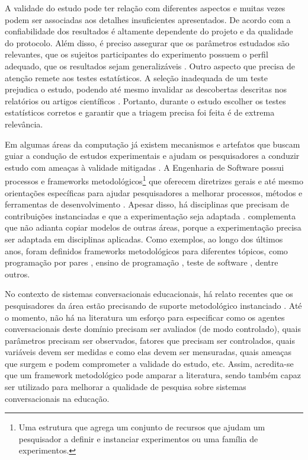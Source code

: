 A validade do estudo pode ter relação com diferentes aspectos e muitas vezes podem ser associadas aos detalhes insuficientes apresentados. De acordo com  a confiabilidade dos resultados é altamente dependente do projeto e da qualidade do protocolo. Além disso, é preciso assegurar que os parâmetros estudados são relevantes, que os sujeitos participantes do experimento possuem o perfil adequado, que os resultados sejam generalizáveis \cite{Wright}. Outro aspecto que precisa de atenção remete aos testes estatísticos. A seleção inadequada de um teste prejudica o estudo, podendo até mesmo invalidar as descobertas descritas nos relatórios ou artigos científicos \cite{Kitchenham:2002}. Portanto, durante o estudo escolher os testes estatísticos corretos e garantir que a triagem precisa foi feita é de extrema relevância. 

Em algumas áreas da computação já existem mecanismos e artefatos que buscam guiar a condução de estudos experimentais e ajudam os pesquisadores a conduzir estudo com ameaças à validade mitigadas \cite{Wohlin}. A Engenharia de Software possui processos e frameworks metodológicos\footnote{Uma estrutura que agrega um conjunto de recursos que ajudam um pesquisador a definir e instanciar experimentos ou uma família de experimentos.} que oferecem diretrizes gerais e até mesmo orientações específicas para ajudar pesquisadores a melhorar processos, métodos e ferramentas de desenvolvimento \cite{1514443}. Apesar disso, há disciplinas que precisam de contribuições instanciadas e que a experimentação seja adaptada \cite{vegas2016can}.  complementa que não adianta copiar modelos de outras áreas, porque a experimentação precisa ser adaptada em disciplinas aplicadas. Como exemplos, ao longo dos últimos anos, foram definidos frameworks metodológicos para diferentes tópicos, como programação por pares \cite{Gallis:2003}, ensino de programação \cite{LilianTese:2019}, teste de software \cite{Vos:2012}, dentre outros.

No contexto de sistemas conversacionais educacionais, há relato recentes que os pesquisadores da área estão precisando de suporte metodológico instanciado \cite{hobert2019}. Até o momento, não há na literatura um esforço para especificar como os agentes conversacionais deste domínio precisam ser avaliados (de modo controlado), quais parâmetros precisam ser observados, fatores que precisam ser controlados, quais variáveis devem ser medidas e como elas devem ser mensuradas, quais ameaças que surgem e podem comprometer a validade do estudo, etc. Assim, acredita-se que um framework metodológico pode amparar a literatura, sendo também capaz ser utilizado para melhorar a qualidade de pesquisa sobre sistemas conversacionais na educação.

